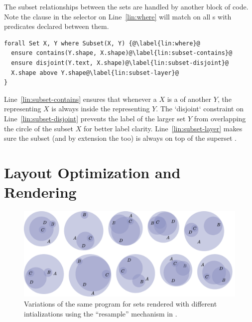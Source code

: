 The subset relationships between the sets are handled by another block of \Style code. Note the  clause in the selector on Line~\ref{lin:where} will match on all s with  predicates declared between them.

\begin{center}
\begin{mdframed}[style=STYCode]
\begin{lstlisting}[language=Sty-Sets-new,escapechar=@]
forall Set X, Y where Subset(X, Y) {@\label{lin:where}@
  ensure contains(Y.shape, X.shape)@\label{lin:subset-contains}@
  ensure disjoint(Y.text, X.shape)@\label{lin:subset-disjoint}@
  X.shape above Y.shape@\label{lin:subset-layer}@
}
\end{lstlisting}
\end{mdframed}
\end{center}

Line~\ref{lin:subset-contains} ensures that whenever a  \(X\) is a  of another  \(Y\), the  representing \(X\) is always inside the  representing \(Y\). The `disjoint` constraint on Line~\ref{lin:subset-disjoint} prevents the label of the larger set \(Y\) from overlapping the circle of the subset \(X\) for better label clarity. Line~\ref{lin:subset-layer} makes sure the subset  (and by extension the  too) is always on top of the superset .

\section{Layout Optimization and Rendering}

\begin{figure}[h!]
    \centering
    \includegraphics[width=\linewidth]{assets/appendix/sets-variations.pdf}
    \caption{Variations of the same \Substance program for sets rendered with different intializations using the ``resample'' mechanism in \Penrose.}
    \label{fig:sets-variations}
\end{figure}


